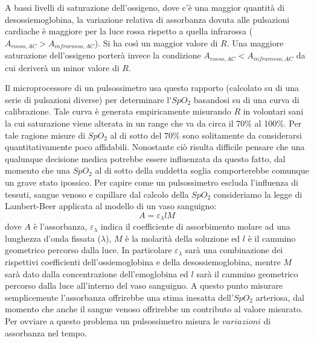 \documentclass[12pt,a4paper, twoside, openright]{report}
\begin{document}
A bassi livelli di saturazione dell'ossigeno, dove c'è una maggior quantità di desossiemoglobina, la variazione relativa di assorbanza dovuta alle pulsazioni cardiache è maggiore per la luce rossa rispetto a quella infrarossa ($A_{rosso,AC}>A_{infrarosso,AC}$). 
Si ha così un maggior valore di $R$. 
Una maggiore saturazione dell'ossigeno porterà invece la condizione $A_{rosso,AC}<A_{infrarosso,AC}$ da cui deriverà un minor valore di $R$. 
\newline

Il microprocessore di un pulsossimetro usa questo rapporto (calcolato su di una serie di pulsazioni diverse) per determinare l'$SpO_{2}$ basandosi su di una curva di calibrazione. 
Tale curva è generata empiricamente misurando $R$ in volontari sani la cui saturazione viene alterata in un range che va da circa il 70\% al 100\%. 
Per tale ragione misure di $SpO_{2}$ al di sotto del 70\% sono solitamente da considerarsi quantitativamente poco affidabili. 
Nonostante ciò risulta difficile pensare che una qualunque decisione medica potrebbe essere influenzata da questo fatto, dal momento che una $SpO_{2}$ al di sotto della suddetta soglia comporterebbe comunque un grave stato ipossico. 
Per capire come un pulsossimetro escluda l'influenza di tessuti, sangue venoso e capillare dal calcolo della $SpO_{2}$ consideriamo la legge di Lambert-Beer applicata al modello di un vaso sanguigno:
\begin{equation}
    \label{eq:Legge di Lambert-Beer}
    A = \varepsilon_{\lambda}lM
\end{equation}
dove $A$ è l'assorbanza, $\varepsilon_{\lambda}$ indica il coefficiente di assorbimento molare ad una lunghezza d'onda fissata ($\lambda$), $M$ è la molarità della soluzione ed $l$ è il cammino geometrico percorso dalla luce. 
In particolare  $\varepsilon_{\lambda}$ sarà una combinazione dei rispettivi coefficienti dell'ossiemoglobina e della desossiemoglobina, mentre $M$ sarà dato dalla concentrazione dell'emoglobina ed $l$ sarà il cammino geometrico percorso dalla luce all'interno del vaso sanguigno. 
A questo punto misurare semplicemente l'assorbanza offrirebbe una stima inesatta dell'$SpO_2$ arteriosa, dal momento che anche il sangue venoso offrirebbe un contributo al valore misurato. 
Per ovviare a questo problema un pulsossimetro misura le $variazioni$ di assorbanza nel tempo. 
\newline
\end{document}
